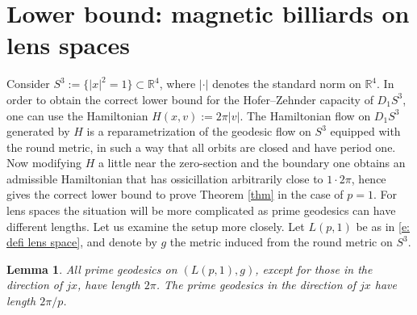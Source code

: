 \documentclass[12pt]{article}
\newtheorem{Lemma}[Definition]{Lemma}
\newcommand{\R}{\mathbb{R}} %
\begin{document}
\section{Lower bound: magnetic billiards on lens spaces}
Consider $S^3:=\lbrace \vert x \vert^2=1\rbrace \subset \R^4$, where $\vert \cdot\vert$ denotes the standard norm on $\R^4$. 
In order to obtain the correct lower bound for the Hofer--Zehnder capacity of \( D_1 S^3 \), one can use the Hamiltonian \( H(x,v) := 2\pi |v| \). The Hamiltonian flow on \( D_1 S^3 \) generated by \( H \) is a reparametrization of the geodesic flow on \( S^3 \) equipped with the round metric, in such a way that all orbits are closed and have period one. Now modifying $H$ a little near the zero-section and the boundary one obtains an admissible Hamiltonian that has ossicillation arbitrarily close to $1\cdot 2\pi$, hence gives the correct lower bound to prove Theorem \ref{thm} in the case of $p=1$. For lens spaces the situation will be more complicated as prime geodesics can have different lengths. Let us examine the setup more closely. Let \( L(p,1) \) be as in \eqref{e: defi lens space}, and denote by \( g \) the metric induced from the round metric on \( S^3 \).  
\begin{Lemma}\label{l1}
    All prime geodesics on \( (L(p,1), g) \), except for those in the direction of \( jx \), have length \( 2\pi \). The prime geodesics in the direction of \( jx \) have length \( 2\pi / p \).
\end{Lemma}
\end{document}
